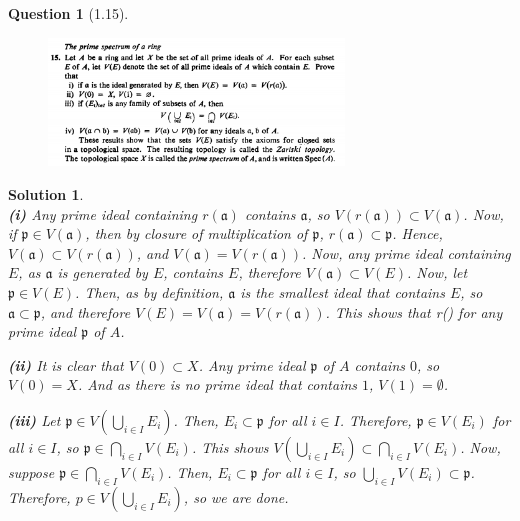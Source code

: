 \documentclass[11pt]{article}
\theoremstyle{plain}
\def\eQb#1\eQe{\begin{eqnarray*}#1\end{eqnarray*}}
\theoremstyle{quest}
\newtheorem*{question}{Question}
\newtheorem*{solution}{Solution}
\begin{document}
\begin{question}[1.15]
\hfill
\begin{figure}[h!]
  \centering
    \includegraphics[width=0.7\textwidth]{d-1-15.png}
\end{figure}
\end{question}
\begin{solution} \hfill \\
\textbf{(i)} Any prime ideal containing $r(\mathfrak{a})$ contains $\mathfrak{a}$,
so $V(r(\mathfrak{a})) \subset V(\mathfrak{a})$. Now, if $\mathfrak{p} \in 
V(\mathfrak{a})$, then by closure of multiplication of $\mathfrak{p}$, $r(\mathfrak{a}) 
\subset \mathfrak{p}$. Hence, $V(\mathfrak{a}) \subset V(r(\mathfrak{a}))$, and
$V(\mathfrak{a}) = V(r(\mathfrak{a}))$. Now, any prime ideal containing $E$,
as $\mathfrak{a}$ is generated by $E$, contains $E$, therefore $V(\mathfrak{a}) 
\subset V(E)$. Now, let $\mathfrak{p} \in V(E)$. Then, as by definition, $\mathfrak{a}$
is the smallest ideal that contains $E$, so $\mathfrak{a} \subset \mathfrak{p}$, 
and therefore $V(E) = V(\mathfrak{a}) = V(r(\mathfrak{a}))$. This shows that
\eQb
E \subset {} \iff {} \subset {} \iff 
r() \subset {}
\eQe
for any prime ideal $\mathfrak{p}$ of $A$. \\  

\smallskip 

\noindent \textbf{(ii)} It is clear that $V(0) \subset X$. Any prime ideal $\mathfrak{p}$
of $A$ contains $0$, so $V(0) = X$. And as there is no prime ideal that contains
$1$, $V(1) = \emptyset$.  \\


\smallskip

\noindent \textbf{(iii)} Let $\mathfrak{p} \in V(\bigcup_{i \in I} E_i)$. Then,
$E_i \subset \mathfrak{p}$ for all $i \in I$. Therefore,
$\mathfrak{p} \in V(E_i)$ for all $i \in I$, so $\mathfrak{p} \in \bigcap_{i \in I}
V(E_i)$. This shows $V(\bigcup_{i \in I} E_i ) \subset \bigcap_{i \in I} 
V(E_i)$. Now, suppose $\mathfrak{p} \in \bigcap_{i \in I} V(E_i)$. Then,  
$E_i \subset \mathfrak{p}$ for all $i \in I$, so $\bigcup_{i \in I} V(E_i) 
\subset \mathfrak{p}$. Therefore, $p \in V(\bigcup_{i \in I} E_i)$, so we are done. \\


\end{solution}
\end{document}
